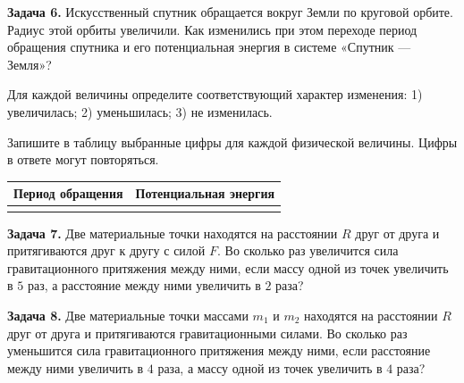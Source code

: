 \begin{taskbasic}[code={\label{task:gravity_v6_n6}}]
\textbf{Задача 6.} Искусственный спутник обращается вокруг Земли по круговой орбите. Радиус этой орбиты увеличили. Как изменились при этом переходе период обращения спутника и его потенциальная энергия в системе «Спутник — Земля»?

Для каждой величины определите соответствующий характер изменения:
1) увеличилась;
2) уменьшилась;
3) не изменилась.

Запишите в таблицу выбранные цифры для каждой физической величины. Цифры в ответе могут повторяться.
\begin{center}
\begin{tabular}{|c|c|}
\hline
Период обращения & Потенциальная энергия \\ \hline
 & \\ \hline
\end{tabular}
\end{center}

\end{taskbasic}

\begin{taskbasic}[code={\label{task:gravity_v7_n2}}]
\textbf{Задача 7.} Две материальные точки находятся на расстоянии $R$ друг от друга и притягиваются друг к другу с силой $F$. Во сколько раз увеличится сила гравитационного притяжения между ними, если массу одной из точек увеличить в $5$ раз, а расстояние между ними увеличить в $2$ раза?

\end{taskbasic}

\begin{taskbasic}[code={\label{task:gravity_v8_n2}}]
\textbf{Задача 8.} Две материальные точки массами $m_1$ и $m_2$ находятся на расстоянии $R$ друг от друга и притягиваются гравитационными силами. Во сколько раз уменьшится сила гравитационного притяжения между ними, если расстояние между ними увеличить в $4$ раза, а массу одной из точек увеличить в $4$ раза?

\end{taskbasic}

